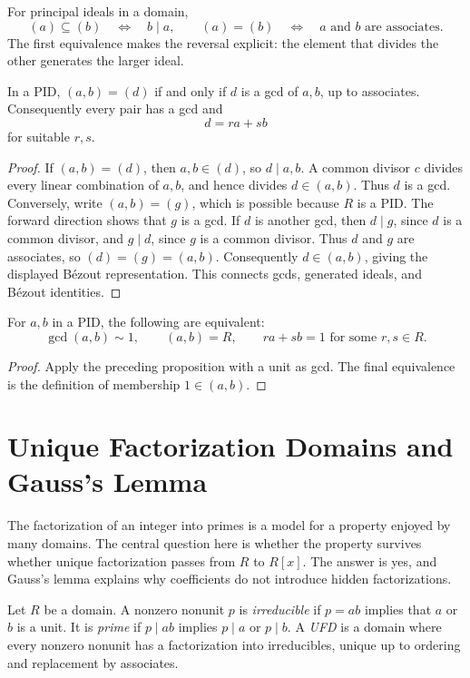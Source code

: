 For principal ideals in a domain,
\[
(a)\subseteq(b)\quad\Longleftrightarrow\quad b\mid a,
\qquad
(a)=(b)\quad\Longleftrightarrow\quad a\text{ and }b\text{ are associates}.
\]
The first equivalence makes the reversal explicit: the element that divides
the other generates the larger ideal.
\begin{proposition}
In a PID, \((a,b)=(d)\) if and only if \(d\) is a gcd of \(a,b\), up to
associates.  Consequently every pair has a gcd and
\[d=ra+sb\]
for suitable \(r,s\).
\end{proposition}
\begin{proof}
If \((a,b)=(d)\), then \(a,b\in(d)\), so \(d\mid a,b\).  A common divisor
\(c\) divides every linear combination of \(a,b\), and hence divides
\(d\in(a,b)\).  Thus \(d\) is a gcd.  Conversely, write
\((a,b)=(g)\), which is possible because \(R\) is a PID.  The forward
direction shows that \(g\) is a gcd.  If \(d\) is another gcd, then
\(d\mid g\), since \(d\) is a common divisor, and \(g\mid d\), since \(g\)
is a common divisor.  Thus \(d\) and \(g\) are associates, so
\((d)=(g)=(a,b)\).  Consequently \(d\in(a,b)\), giving the displayed
B\'ezout representation.  This connects gcds, generated ideals, and
B\'ezout identities.
\end{proof}

\begin{corollary}\label{cor:pid-coprime-bezout}
For \(a,b\) in a PID, the following are equivalent:
\[
\gcd(a,b)\sim1,\qquad (a,b)=R,\qquad ra+sb=1
\text{ for some }r,s\in R.
\]
\end{corollary}
\begin{proof}
Apply the preceding proposition with a unit as gcd. The final equivalence is
the definition of membership \(1\in(a,b)\).
\end{proof}

\section{Unique Factorization Domains and Gauss's Lemma}
The factorization of an integer into primes is a model for a property enjoyed
by many domains.  The central question here is whether the property survives
whether unique factorization passes from \(R\) to \(R[x]\).  The answer is
yes, and Gauss's
lemma explains why coefficients do not introduce hidden factorizations.

\begin{definition}
Let \(R\) be a domain. A nonzero nonunit \(p\) is \emph{irreducible} if
\(p=ab\) implies that \(a\) or \(b\) is a unit.  It is \emph{prime} if
\(p\mid ab\) implies \(p\mid a\) or \(p\mid b\).  A \emph{UFD} is a domain
where every nonzero nonunit has a factorization into irreducibles, unique up
to ordering and replacement by associates.
\end{definition}

